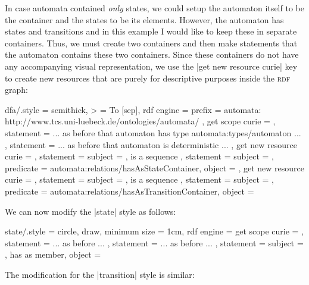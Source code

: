 In case automata contained \emph{only} states, we could setup the automaton
itself to be the container and the states to be its elements. However, the
automaton has states and transitions and in this example I would like to keep
these in separate containers. Thus, we must create two containers and then make
statements that the automaton contains these two containers. Since these
containers do not have any accompanying visual representation, we use the
|get new resource curie| key to create new resources that are purely for
descriptive purposes inside the \textsc{rdf} graph:
%
\begin{codeexample}
dfa/.style = {
  semithick, > = To [sep], %
  rdf engine = {
    prefix = { automata: http://www.tcs.uni-luebeck.de/ontologies/automata/ },
    get scope curie = \mylibAutomatonCurie,
    statement = { ... as before that automaton has type automata:types/automaton ... },
    statement = { ... as before that automaton is deterministic ... },
    get new resource curie = \mylibStateContainerCurie,
    statement = {
      subject    = \mylibStateContainerCurie,
      is a sequence },
    statement = {
      subject    = \mylibAutomatonCurie,
      predicate  = automata:relations/hasAsStateContainer,
      object     = \mylibStateContainerCurie },
    get new resource curie = \mylibTransitionContainerCurie,
    statement = {
      subject    = \mylibTransitionContainerCurie,
      is a sequence },
    statement = {
      subject    = \mylibAutomatonCurie,
      predicate  = automata:relations/hasAsTransitionContainer,
      object     = \mylibTransitionContainerCurie } } }
\end{codeexample}

We can now modify the |state| style as follows:
%
\begin{codeexample}
state/.style = {
  circle, draw, minimum size = 1cm, %
  rdf engine = {
    get scope curie = \mylibStateCurie,
    statement = { ... as before ... },
    statement = { ... as before ... },
    statement = {
      subject     = \mylibStateContainerCurie,
      has as member,
      object      = \mylibStateCurie } } }
\end{codeexample}

The modification for the |transition| style is similar:
%



